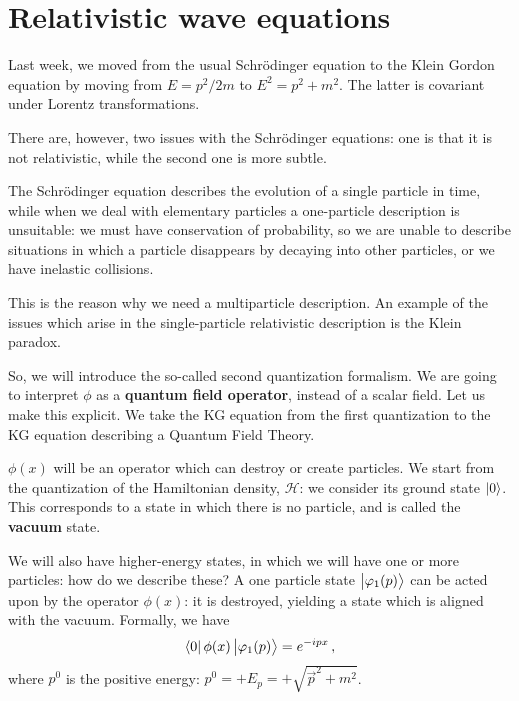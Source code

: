 \documentclass[main.tex]{subfiles}
\begin{document}
\section{Relativistic wave equations}


Last week, we moved from the usual Schrödinger equation to the Klein Gordon equation by moving from \(E = p^2 / 2m\) to \(E^2 = p^2 + m^2\). 
The latter is covariant under Lorentz transformations. 

There are, however, two issues with the Schrödinger equations:
one is that it is not relativistic, while the second one is more subtle. 

The Schrödinger equation describes the evolution of a single particle in time, while when we deal with elementary particles a one-particle description is unsuitable: we must have conservation of probability, so we are unable to describe situations in which a particle disappears by decaying into other particles, or we have inelastic collisions. 

This is the reason why we need a multiparticle description. 
An example of the issues which arise in the single-particle relativistic description is the Klein paradox. 

So, we will introduce the so-called second quantization formalism. 
We are going to interpret \(\phi \) as a \textbf{quantum field operator}, instead of a scalar field. Let us make this explicit. 
We take the KG equation from the first quantization to the KG equation describing a Quantum Field Theory. 

\(\phi (x)\) will be an operator which can destroy or create particles. 
We start from the quantization of the Hamiltonian density, \(\mathscr{H}\): we consider its ground state \(\ket{0}\). 
This corresponds to a state in which there is no particle, and is called the \textbf{vacuum} state. 

We will also have higher-energy states, in which we will have one or more particles: how do we describe these? 
A one particle state \(\ket{\varphi_{1 } (p)}\) can be acted upon by the operator \(\phi (x)\): it is destroyed, yielding a state which is aligned with the vacuum. Formally, we have 
%
\begin{align}
\bra{0} \phi (x) \ket{\varphi_1 (p)} = e^{-ipx}
\,,
\end{align}
%
where \(p^{0}\) is the positive energy: \(p^{0} = + E_p = + \sqrt{\vec{p}^2 + m^2}\). 
\end{document}
